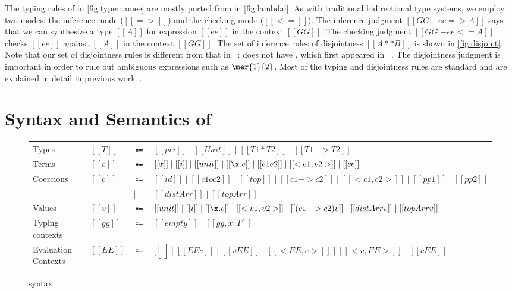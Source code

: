 The typing rules of \namee in \cref{fig:type:namee} are mostly ported from \oname in \cref{fig:lambdai}.
As with traditional bidirectional type systems, we employ two modes: the
inference mode ($[[=>]]$) and the checking mode ($[[<=]]$). The inference
judgment $[[GG |- ee => A]]$ says that we can synthesize a type $[[A]]$ for
expression $[[ee]]$ in the context $[[GG]]$. The checking judgment $[[GG |- ee <= A]]$
checks $[[ee]]$ against $[[A]]$ in the context $[[GG]]$. The set of
inference rules of disjointness $[[A ** B]]$ is shown in \cref{fig:disjoint}.
Note that our set of disjointness rules is different from that in
\oname~\citep[Figure 10]{oliveira2016disjoint}: \oname does not have
, which first appeared in \fname~\citep[Figure 3]{alpuimdisjoint}.
The disjointness judgment is
important in order to rule out ambiguous expressions such as $\mer{1}{2}$. Most
of the typing and disjointness rules are standard and are explained in detail in
previous work~\citep{oliveira2016disjoint, alpuimdisjoint}.



\section{Syntax and Semantics of \tname}
\label{sec:elaboration}

\begin{figure}[t]
  \centering
\begin{tabular}{llll} \toprule
  Types & $[[T]]$ & $\Coloneqq$ & $[[pri]] \mid [[Unit]] \mid [[T1 * T2]] \mid [[T1 -> T2]] $ \\
  Terms & $[[e]]$ & $\Coloneqq$ & $[[x]] \mid [[i]] \mid [[unit]] \mid [[\x . e]] \mid [[e1 e2]] \mid [[<e1, e2>]] \mid [[c e]]$ \\
  Coercions & $[[c]]$ & $\Coloneqq$ & $ [[id]] \mid [[c1 o c2]] \mid [[top]] \mid [[c1 -> c2]] \mid [[<c1, c2>]] \mid [[pp1]] \mid [[pp2]] $ \\
  &  &  $\mid$ & $   [[distArr]] \mid [[topArr]]  $ \\
  Values & $[[v]]$ & $\Coloneqq$ & $[[unit]] \mid [[i]] \mid [[\x.e]] \mid  [[<v1, v2>]] \mid [[(c1 -> c2) v]] \mid [[distArr v]] \mid [[topArr v]] $ \\
  Typing contexts & $[[gg]]$ & $\Coloneqq$ & $[[empty]] \mid [[gg , x : T]]$ \\
  Evaluation Contexts & $[[EE]]$ & $\Coloneqq$ &  $  [[__]] \mid [[EE e]] \mid [[v EE]] \mid [[ < EE , e >  ]] \mid [[ < v , EE > ]] \mid [[ c EE  ]]$ \\ \bottomrule
\end{tabular}
  \caption{\tname syntax}
  \label{fig:target}
\end{figure}

